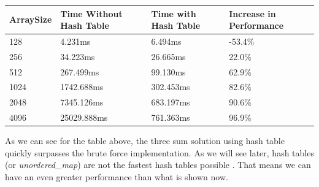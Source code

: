 \bigskip

\begin{tabular}{|l|l|l|l|}
  \hline
  ArraySize & Time Without Hash Table & Time with Hash Table & Increase in Performance \\
  \hline
  128       & 4.231ms                 & 6.494ms              & -53.4\%                  \\
  \hline
  256       & 34.223ms                & 26.665ms             & 22.0\%                   \\
  \hline
  512       & 267.499ms               & 99.130ms             & 62.9\%                   \\
  \hline
  1024      & 1742.688ms              & 302.453ms            & 82.6\%                   \\
  \hline
  2048      & 7345.126ms              & 683.197ms            & 90.6\%                   \\
  \hline
  4096      & 25029.888ms             & 761.363ms            & 96.9\%                   \\
  \hline
\end{tabular}

\bigskip

As we can see for the table above, the three sum solution using hash table quickly surpasses the brute force implementation. As we will see later, hash tables (or \textit{unordered\_map}) are not the fastest hash tables possible \cite{UnorderedMapDiscussion}. That means we can have an even greater performance than what is shown now.  